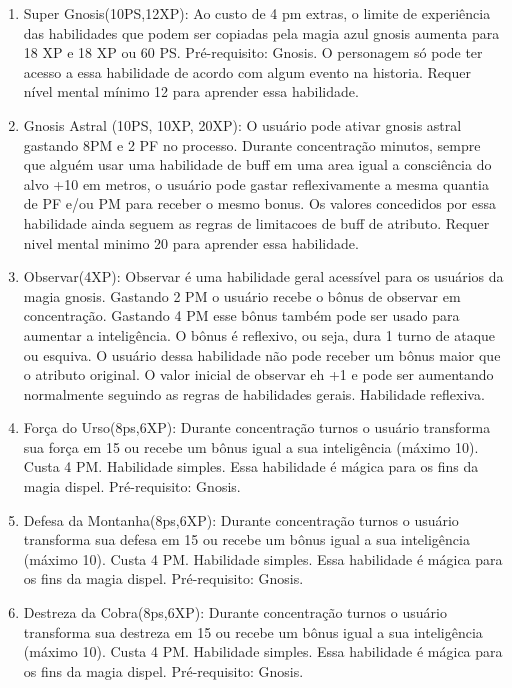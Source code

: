 \begin{enumerate}
	\item Super Gnosis(10PS,12XP): Ao custo de 4 pm extras, o limite de experiência das habilidades que podem ser copiadas pela magia azul gnosis aumenta para 18 XP e 18 XP ou 60 PS. Pré-requisito: Gnosis. O personagem só pode ter acesso a essa habilidade de acordo com algum evento na historia. Requer nível mental mínimo 12 para aprender essa habilidade.
	
	\item Gnosis Astral (10PS, 10XP, 20XP): O usuário pode ativar gnosis astral gastando 8PM e 2 PF no processo. Durante concentração minutos, sempre que alguém usar uma habilidade de buff em uma area igual a consciência do alvo +10 em metros, o usuário pode gastar reflexivamente a mesma quantia de PF e/ou PM para receber o mesmo bonus. Os valores concedidos por essa habilidade ainda seguem as regras de limitacoes de buff de atributo. Requer nivel mental minimo 20 para aprender essa habilidade.
	
	\item Observar(4XP): Observar é uma habilidade geral acessível para os usuários da magia gnosis. Gastando 2 PM o usuário recebe o bônus de observar em concentração. Gastando 4 PM esse bônus também pode ser usado para aumentar a inteligência. O bônus é reflexivo, ou seja, dura 1 turno de ataque ou esquiva. O usuário dessa habilidade não pode receber um bônus maior que o atributo original. O valor inicial de observar eh +1 e pode ser aumentando normalmente seguindo as regras de habilidades gerais. Habilidade reflexiva.	
 
	\item Força do Urso(8ps,6XP): Durante concentração turnos o usuário transforma sua força em 15 ou recebe um bônus igual a sua inteligência (máximo 10). Custa 4 PM. Habilidade simples. Essa habilidade é mágica para os fins da magia dispel. Pré-requisito: Gnosis.

	\item Defesa da Montanha(8ps,6XP): Durante concentração turnos o usuário transforma sua defesa em 15 ou recebe um bônus igual a sua inteligência (máximo 10). Custa 4 PM. Habilidade simples. Essa habilidade é mágica para os fins da magia dispel. Pré-requisito: Gnosis.

	\item Destreza da Cobra(8ps,6XP): Durante concentração turnos o usuário transforma sua destreza em 15 ou recebe um bônus igual a sua inteligência (máximo 10). Custa 4 PM. Habilidade simples. Essa habilidade é mágica para os fins da magia dispel. Pré-requisito: Gnosis.


\end{enumerate}
